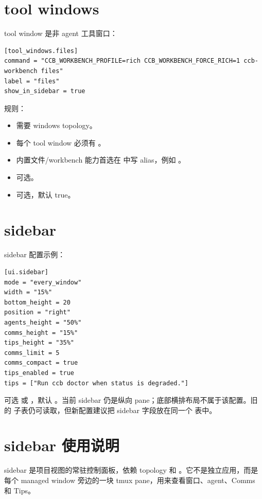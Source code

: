 \section{tool windows}

tool window 是非 agent 工具窗口：

\begin{lstlisting}
[tool_windows.files]
command = "CCB_WORKBENCH_PROFILE=rich CCB_WORKBENCH_FORCE_RICH=1 ccb-workbench files"
label = "files"
show_in_sidebar = true
\end{lstlisting}

规则：

\begin{itemize}
  \item {} 需要 windows topology。
  \item 每个 tool window 必须有 。
  \item 内置文件/workbench 能力首选在  中写  alias，例如 。
  \item {} 可选。
  \item {} 可选，默认 true。
\end{itemize}

\section{sidebar}

sidebar 配置示例：

\begin{lstlisting}
[ui.sidebar]
mode = "every_window"
width = "15%"
bottom_height = 20
position = "right"
agents_height = "50%"
comms_height = "15%"
tips_height = "35%"
comms_limit = 5
comms_compact = true
tips_enabled = true
tips = ["Run ccb doctor when status is degraded."]
\end{lstlisting}

 可选  或 ，默认 。当前 sidebar 仍是纵向 pane；底部横排布局不属于该配置。旧的  子表仍可读取，但新配置建议把 sidebar 字段放在同一个  表中。

\section{sidebar 使用说明}

sidebar 是项目视图的常驻控制面板，依赖  topology 和 。它不是独立应用，而是每个 managed window 旁边的一块 tmux pane，用来查看窗口、agent、Comms 和 Tips。

